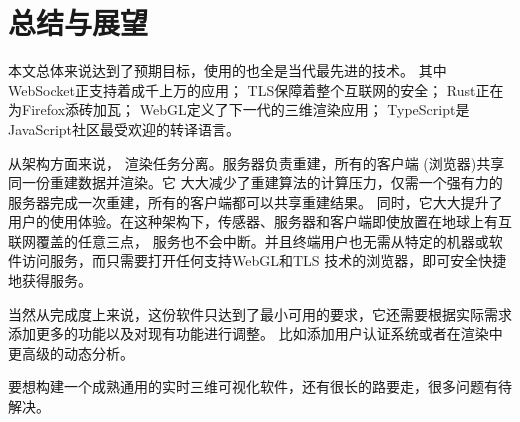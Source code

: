 \cleardoublepage

\section{总结与展望}
本文总体来说达到了预期目标，使用的也全是当代最先进的技术。
其中WebSocket正支持着成千上万的应用；
TLS保障着整个互联网的安全；
Rust正在为Firefox添砖加瓦；
WebGL定义了下一代的三维渲染应用；
TypeScript是JavaScript社区最受欢迎的转译语言。

从架构方面来说，
渲染任务分离。服务器负责重建，所有的客户端 (浏览器)共享同一份重建数据并渲染。它
大大减少了重建算法的计算压力，仅需一个强有力的服务器完成一次重建，所有的客户端都可以共享重建结果。 
同时，它大大提升了用户的使用体验。在这种架构下，传感器、服务器和客户端即使放置在地球上有互联网覆盖的任意三点，
服务也不会中断。并且终端用户也无需从特定的机器或软件访问服务，而只需要打开任何支持WebGL和TLS
技术的浏览器，即可安全快捷地获得服务。

当然从完成度上来说，这份软件只达到了最小可用的要求，它还需要根据实际需求添加更多的功能以及对现有功能进行调整。
比如添加用户认证系统或者在渲染中更高级的动态分析。

要想构建一个成熟通用的实时三维可视化软件，还有很长的路要走，很多问题有待解决。
